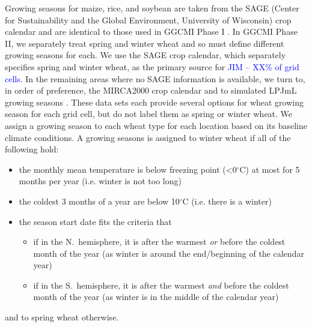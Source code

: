 \documentclass[gmd, manuscript]{copernicus} %
\begin{document}
Growing seasons for maize, rice, and soybean are taken from the SAGE (Center for Sustainability and the Global Environment, University of Wisconsin) crop calendar \citep{Sacks2010} and are identical to those used in GGCMI Phase I \citep{Elliott2015}.
In GGCMI Phase II, we separately treat spring and winter wheat and so must define different growing seasons for each.
We use the SAGE crop calendar, which separately specifies spring and winter wheat, as the primary source for \textcolor{blue}{JIM -- XX\% of grid cells}. 
In the remaining areas where no SAGE information is available, we turn to, in order of preference, the MIRCA2000 crop calendar \citep{Portmann2010} and to simulated LPJmL growing seasons \citep{waha2012climate}.  
These data sets each provide several options for wheat growing season for each grid cell, but do not label them as spring or winter wheat. We assign a growing season to each wheat type for each location based on its baseline climate conditions. 
A growing seasons is assigned to winter wheat if all of the following hold:
\begin{itemize} %
\item the monthly mean temperature is below freezing point (<0$^\circ$C) at most for 5 months per year (i.e. winter is not too long)
\item the coldest 3 months of a year are below 10$^\circ$C (i.e. there is a winter)
\item the season start date fits the criteria that
  \begin{itemize} 
    \item if in the N.\ hemisphere, it is after the warmest \textit{or} before the coldest month of the year (as winter is around the end/beginning of the calendar year)
    \item if in the S.\ hemisphere, it is after the warmest \textit{and} before the coldest month of the year (as winter is in the middle of the calendar year)
    \end{itemize}
\end{itemize}
and to spring wheat otherwise. 
\end{document}
